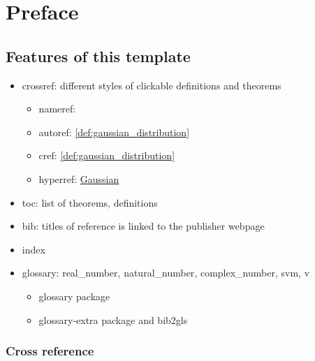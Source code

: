 \chapter*{Preface}

\lipsum %

\section{Features of this template}

\begin{itemize}
    \item crossref: different styles of clickable definitions and theorems
    \begin{itemize}
        \item nameref:

        \item autoref:
            \autoref{def:gaussian_distribution}

        \item cref:
            \cref{def:gaussian_distribution}

        \item hyperref:
            \hyperref[def:gaussian_distribution]{Gaussian}
    \end{itemize}

    \item toc: list of theorems, definitions
    \item bib: titles of reference is linked to the publisher webpage 
        \cite{kitaev2002classical}
        \cite{childsUniversalComputationQuantum2009}
    \item index
    \item glossary:
    \gls{real_number},
    \gls{natural_number},
    \gls{complex_number},
    \gls{svm},
    \gls{v}
    \begin{itemize}
        \item glossary package
        \item glossary-extra package and bib2gls
    \end{itemize}
\end{itemize}

\subsection{Cross reference}

